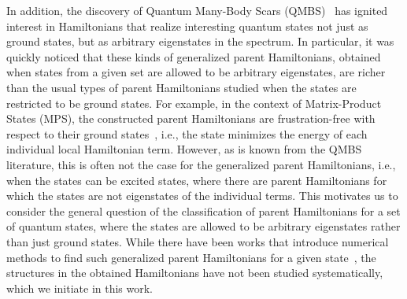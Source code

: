 \documentclass[prx,letterpaper,aps,superscriptaddress,floatfix,twocolumn,nofootinbib]{revtex4-2}
\theoremstyle{definition}
\begin{document}
%
In addition, the discovery of Quantum Many-Body Scars (QMBS)~\cite{Serbyn_2021, Moudgalya_2022, Papic_2022, Chandran_2023, Bernien_2017} has ignited interest in Hamiltonians that realize interesting quantum states not just as ground states, but as arbitrary eigenstates in the spectrum.
%
In particular, it was quickly noticed that these kinds of generalized parent Hamiltonians, obtained when states from a given set are allowed to be arbitrary eigenstates, are richer than the usual types of parent Hamiltonians studied when the states are restricted to be ground states.
%
For example, in the context of Matrix-Product States (MPS), the constructed parent Hamiltonians are frustration-free with respect to their ground states~\cite{Perez-Garcia2007,fernándezgonzalez2015}, i.e., the state minimizes the energy of each individual local Hamiltonian term.
%
However, as is known from the QMBS literature, this is often not the case for the generalized parent Hamiltonians, i.e., when the states can be excited states, where there are parent Hamiltonians for which the states are not eigenstates of the individual terms.
%
This motivates us to consider the general question of the classification of parent Hamiltonians for a set of quantum states, where the states are allowed to be arbitrary eigenstates rather than just ground states.
%
While there have been works that introduce numerical methods to find such generalized parent Hamiltonians for a given state~\cite{qiranard2017, chertkovclark2018, greiter2018parent}, the structures in the obtained Hamiltonians have not been studied systematically, which we initiate in this work.
%
\end{document}
